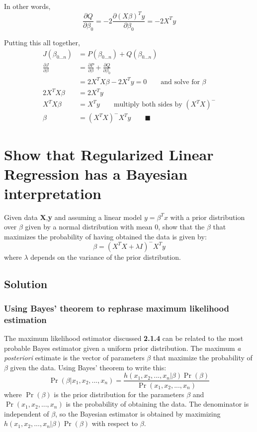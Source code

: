 \documentclass{article}
\begin{document}
	In other words,
	\begin{equation*}
	\frac{\partial Q}{\partial \beta_0}=-2\frac{\partial (X\beta)^Ty}{\partial \beta_0}=-2X^Ty
	\end{equation*}
		
	Putting this all together,
	\begin{align*}
	J(\beta_{0...n}) &= P(\beta_{0...n})+Q(\beta_{0...n})\\
	\frac{\partial J}{\partial\beta}&=\frac{\partial P}{\partial \beta}+\frac{\partial Q}{\partial \beta_0}\\
	&=2X^TX\beta-2X^Ty=0\qquad\text{and solve for $\beta$}\\
	2X^TX\beta&=2X^Ty\\
	X^TX\beta&=X^Ty\qquad\text{multiply both sides by $(X^TX)^-$}\\
	\beta&=(X^TX)^-X^Ty\qquad\blacksquare
	\end{align*}
	
	\section{Show that Regularized Linear Regression has a Bayesian interpretation}
	Given data \textbf{X},\textbf{y} and assuming a linear model $y=\beta^Tx$ with a prior distribution over $\beta$ given by a normal distribution with mean 0, show that the $\beta$ that maximizes the probability of having obtained the data is given by:
	\begin{equation*}
	\beta=(X^TX+\lambda I)^- X^Ty
	\end{equation*}
	where $\lambda$ depends on the variance of the prior distribution.
	
	\subsection{Solution}
	\subsubsection{Using Bayes' theorem to rephrase maximum likelihood estimation}
	The maximum likelihood estimator discussed \textbf{2.1.4} can be related to the most probable Bayes estimator given a uniform prior distribution. The maximum \textit{a posteriori} estimate is the vector of parameters $\beta$ that maximize the probability of $\beta$ given the data. Using Bayes' theorem to write this:
	\begin{equation*}
	\Pr(\beta|x_1, x_2,...,x_n)=\frac{h(x_1, x_2,...,x_n|\beta)\Pr(\beta)}{\Pr(x_1, x_2,...,x_n)}
	\end{equation*}
	where $\Pr(\beta)$ is the prior distribution for the parameters $\beta$ and $\Pr(x_1, x_2,...,x_n)$ is the probability of obtaining the data. The denominator is independent of $\beta$, so the Bayesian estimator is obtained by maximizing $h(x_1, x_2,...,x_n|\beta)\Pr(\beta)$ with respect to $\beta$.
	
\end{document}
